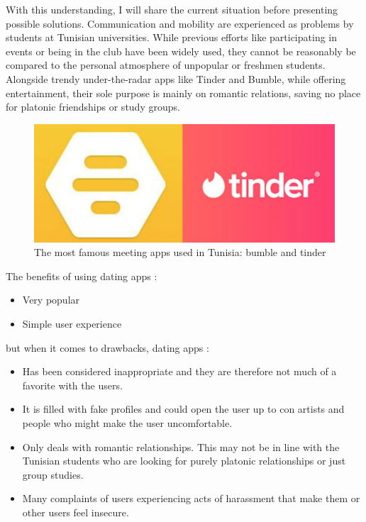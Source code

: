 With this understanding, I will share the current situation before presenting possible solutions. Communication and mobility are experienced as problems by students at Tunisian universities. While previous efforts like participating in events or being in the club have been widely used, they cannot be reasonably be compared to the personal atmosphere of unpopular or freshmen students. Alongside trendy under-the-radar apps like Tinder and Bumble, while offering entertainment, their sole purpose is mainly on romantic relations, saving no place for platonic friendships or study groups.
\\
\begin{figure}[H] 
            \centering
            \includegraphics[scale=0.5]{bumblextinder.png}
            \caption{The most famous meeting apps used in Tunisia: bumble and tinder} 
            \label{fig: meeting appslogos}
\end{figure}
The benefits of using dating apps :

\begin{itemize}
    \item Very popular
    \item Simple user experience
\end{itemize}
but when it comes to drawbacks, dating apps :

\begin{itemize}
    \item Has been considered inappropriate and they are therefore not much of a favorite with the users.
    \item It is filled with fake profiles and could open the user up to con artists and people who might make the user uncomfortable.
    \item Only deals with romantic relationships. This may not be in line with the Tunisian students who are looking for purely platonic relationships or just group studies.
    \item Many complaints of users experiencing acts of harassment that make them or other users feel insecure.
\end{itemize}

